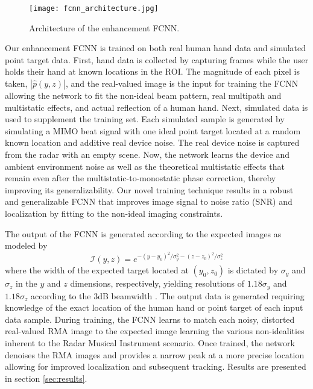 \documentclass[10pt,journal,final]{IEEEtran}
\begin{document}
\begin{figure}[h]
	\centering
	\texttt{[image: fcnn\_architecture.jpg]}
	\caption{Architecture of the enhancement FCNN.}
	\label{fig:fcnn_architecture}
\end{figure}

Our enhancement FCNN is trained on both real human hand data and simulated point target data. First, hand data is collected by capturing frames while the user holds their hand at known locations in the ROI. The magnitude of each pixel is taken, $|\hat{p}(y,z)|$, and the real-valued image is the input for training the FCNN allowing the network to fit the non-ideal beam pattern, real multipath and multistatic effects, and actual reflection of a human hand. Next, simulated data is used to supplement the training set. Each simulated sample is generated by simulating a MIMO beat signal with one ideal point target located at a random known location and additive real device noise. The real device noise is captured from the radar with an empty scene. Now, the network learns the device and ambient environment noise as well as the theoretical multistatic effects that remain even after the multistatic-to-monostatic phase correction, thereby improving its generalizability. Our novel training technique results in a robust and generalizable FCNN that improves image signal to noise ratio (SNR) and localization by fitting to the non-ideal imaging constraints. 

The output of the FCNN is generated according to the expected images as modeled by 
\begin{equation}
\label{eq:fcnn_expected_image}
	\mathcal{I}(y,z) = e^{-(y - y_0)^2/\sigma_y^2 -(z - z_0)^2/\sigma_z^2}
\end{equation}
where the width of the expected target located at $(y_0,z_0)$ is dictated by $\sigma_y$ and $\sigma_z$ in the $y$ and $z$ dimensions, respectively, yielding resolutions of $1.18\sigma_y$ and $1.18\sigma_z$ according to the $3$dB beamwidth \cite{sar_cnn:direct1}. The output data is generated requiring knowledge of the exact location of the human hand or point target of each input data sample. During training, the FCNN learns to match each noisy, distorted real-valued RMA image to the expected image learning the various non-idealities inherent to the Radar Musical Instrument scenario. Once trained, the network denoises the RMA images and provides a narrow peak at a more precise location allowing for improved localization and subsequent tracking. Results are presented in section \ref{sec:results}.
\end{document}
